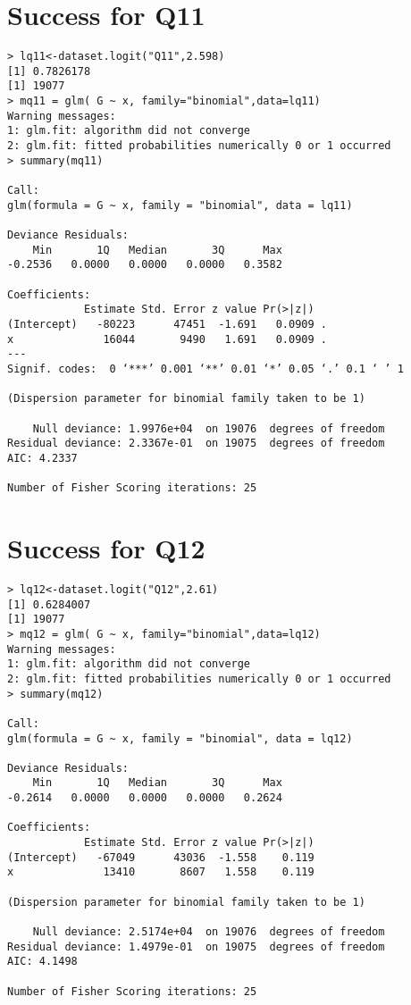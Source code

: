 \documentclass{amsart}
\begin{document}
\section{Success for Q11}

\begin{verbatim}
> lq11<-dataset.logit("Q11",2.598)
[1] 0.7826178
[1] 19077
> mq11 = glm( G ~ x, family="binomial",data=lq11)
Warning messages:
1: glm.fit: algorithm did not converge 
2: glm.fit: fitted probabilities numerically 0 or 1 occurred 
> summary(mq11)

Call:
glm(formula = G ~ x, family = "binomial", data = lq11)

Deviance Residuals: 
    Min       1Q   Median       3Q      Max  
-0.2536   0.0000   0.0000   0.0000   0.3582  

Coefficients:
            Estimate Std. Error z value Pr(>|z|)  
(Intercept)   -80223      47451  -1.691   0.0909 .
x              16044       9490   1.691   0.0909 .
---
Signif. codes:  0 ‘***’ 0.001 ‘**’ 0.01 ‘*’ 0.05 ‘.’ 0.1 ‘ ’ 1

(Dispersion parameter for binomial family taken to be 1)

    Null deviance: 1.9976e+04  on 19076  degrees of freedom
Residual deviance: 2.3367e-01  on 19075  degrees of freedom
AIC: 4.2337

Number of Fisher Scoring iterations: 25
\end{verbatim}

\section{Success for Q12}

\begin{verbatim}
> lq12<-dataset.logit("Q12",2.61)
[1] 0.6284007
[1] 19077
> mq12 = glm( G ~ x, family="binomial",data=lq12)
Warning messages:
1: glm.fit: algorithm did not converge 
2: glm.fit: fitted probabilities numerically 0 or 1 occurred 
> summary(mq12)

Call:
glm(formula = G ~ x, family = "binomial", data = lq12)

Deviance Residuals: 
    Min       1Q   Median       3Q      Max  
-0.2614   0.0000   0.0000   0.0000   0.2624  

Coefficients:
            Estimate Std. Error z value Pr(>|z|)
(Intercept)   -67049      43036  -1.558    0.119
x              13410       8607   1.558    0.119

(Dispersion parameter for binomial family taken to be 1)

    Null deviance: 2.5174e+04  on 19076  degrees of freedom
Residual deviance: 1.4979e-01  on 19075  degrees of freedom
AIC: 4.1498

Number of Fisher Scoring iterations: 25
\end{verbatim}
\end{document}
